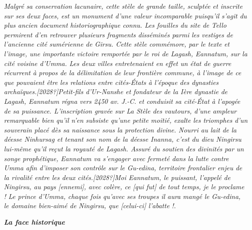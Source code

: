 \documentclass[a4paper,10pt]{article}
\begin{document}
\begin{itemize}
\textit{Malgré sa conservation lacunaire, cette stèle de grande taille,
sculptée et inscrite sur ses deux faces, est un monument
d'une valeur incomparable puisqu'il
s'agit du plus ancien document historiographique
connu. Les fouilles du site de Tello permirent d'en
retrouver plusieurs fragments disséminés parmi les vestiges de
l'ancienne cité sumérienne de Girsu. Cette stèle
commémore, par le texte et l'image, une importante
victoire remportée par le roi de Lagash, Eannatum, sur la cité voisine
d'Umma. Les deux villes entretenaient en effet un état
de guerre récurrent à propos de la délimitation de leur frontière
commune, à l'image de ce que pouvaient être les
relations entre cités-États à l'époque des dynasties
archaïques.[2028?]Petit-fils d'Ur-Nanshe et fondateur
de la Ière dynastie de Lagash, Eannatum régna vers 2450 av. J.-C. et
conduisit sa cité-État à l'apogée de sa puissance.
L'inscription gravée sur }\textit{La Stèle des
vautours}\textit{, d'une ampleur remarquable bien
qu'il n'en subsiste
qu'une petite moitié, exalte les triomphes
d'un souverain placé dès sa naissance sous la
protection divine. Nourri au lait de la déesse Ninhursag et tenant son
nom de la déesse Inanna, c'est du dieu Ningirsu
lui-même qu'il reçut la royauté de Lagash. Assuré du
soutien des divinités par un songe prophétique, Eannatum va
s'engager avec fermeté dans la lutte contre Umma afin
d'imposer son contrôle sur le Gu-edina, territoire
frontalier enjeu de la rivalité entre les deux
cités.[2028?]{\textquotedbl}}\textit{Moi Eannatum, le puissant,
l'appelé de Ningirsu, au pays [ennemi], avec colère,
ce [qui fut] de tout temps, je le proclame ! Le prince
d'Umma, chaque fois qu'avec ses
troupes il aura mangé le Gu-edina, le domaine bien-aimé de Ningirsu,
que [celui-ci] l'abatte }\textit{!{\textquotedbl}.}

\textbf{\textit{La face {\textquotedbl}historique{\textquotedbl}}}


\end{itemize}
\end{document}
